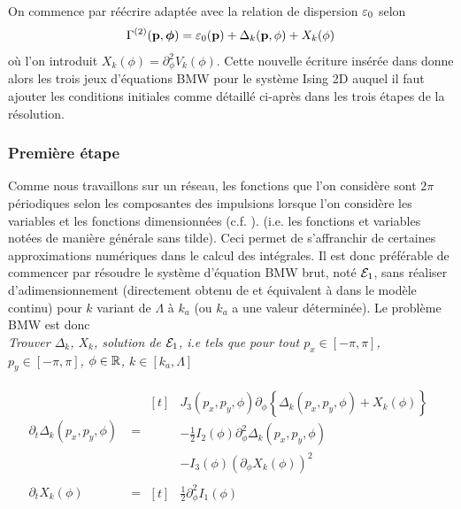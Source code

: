 \documentclass[10pt]{article}
\begin{document}
\begin{multicols}{2}
On commence par réécrire  adaptée avec la relation de dispersion $\varepsilon_0$ selon
\begin{equation}
\Gamma^{(2)}({\bf p}, \boldsymbol{ \phi}) = \varepsilon_0({\bf p}) + \Delta_k({\bf p}, \phi) + X_k(\phi)
\end{equation} 
où l'on introduit $X_k(\phi) = \partial_{\phi}^2 V_k(\phi)$.
Cette nouvelle écriture insérée dans  donne alors les trois jeux d'équations BMW pour le système Ising 2D auquel il faut ajouter les conditions initiales comme détaillé ci-après dans les trois étapes de la résolution.


\subsubsection{Première étape}

Comme nous travaillons sur un réseau, les fonctions que l'on considère sont $2\pi$ périodiques selon les composantes des impulsions lorsque l'on considère les variables et les fonctions dimensionnées (c.f. ). (i.e. les fonctions et variables notées de manière générale sans tilde). Ceci permet de s'affranchir de certaines approximations numériques dans le calcul des intégrales. Il est donc préférable de commencer par résoudre le système d'équation BMW brut, noté $\mathcal{E}_1$, sans réaliser d'adimensionnement (directement obtenu de  et équivalent à  dans le modèle continu) pour $k $ variant de $\Lambda$ à $k_a$ (ou $k_a$ a une valeur déterminée). Le problème BMW est donc \\

\noindent
{\itshape Trouver $\Delta_k$, $X_k$, solution de $\mathcal{E}_1$, i.e tels que pour tout $p_x \in [-\pi, \pi]$, $p_y \in [-\pi, \pi]$, $\phi \in \mathbb{R}$, $k\in [k_a, \Lambda]$}


\begin{align}
	\partial_t  \Delta_k (p_x, p_y, \phi) & = 
	\begin{aligned}[t]
	&  J_3(p_x, p_y, \phi) \partial_{\phi} \left\{ \Delta_k (p_x, p_y, \phi) + X_k(\phi) \right\} \\
	&  - \frac{1}{2} I_2(\phi) \partial_{\phi}^2 \Delta_k(p_x, p_y, \phi) \\
	& - I_3(\phi){(\partial_{\phi} X_k(\phi))}^2
	\end{aligned}
	\label{eqn} \\
	\partial_t X_k(\phi) & = 
	\begin{aligned}[t]
		& \frac{1}{2} \partial_{\phi}^2 I_1(\phi)
	\end{aligned}
\end{align}


\end{multicols}
\end{document}
